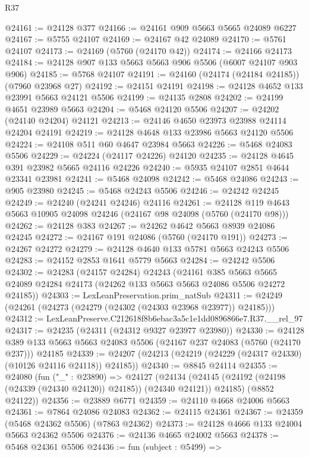 \begin{lexlean}{R37}
\begin{coremodule}
@24161 := @24128 @377
@24166 := @24161 @909 @5663 @5665 @24089 @6227
@24167 := @5755 @24107
@24169 := @24167 @42 @24089
@24170 := @5761 @24107
@24173 := @24169 (@5760 (@24170 @42))
@24174 := @24166 @24173
@24184 := @24128 @907 @133 @5663 @5663 @906 @5506 (@6007 @24107 @903 @906)
@24185 := @5768 @24107
@24191 := @24160 (@24174 (@24184 @24185)) (@7960 @23968 @27)
@24192 := @24151 @24191
@24198 := @24128 @4652 @133 @23991 @5663 @24121 @5506
@24199 := @24135 @2808
@24202 := @24199 @4651 @23989 @5663
@24204 := @5468 @24120 @5506
@24207 := @24202 (@24140 @24204) @24121
@24213 := @24146 @4650 @23973 @23988 @24114 @24204 @24191
@24219 := @24128 @4648 @133 @23986 @5663 @24120 @5506
@24224 := @24108 @511 @60 @4647 @23984 @5663
@24226 := @5468 @24083 @5506
@24229 := @24224 (@24117 @24226) @24120
@24235 := @24128 @4645 @391 @23982 @5665 @24116 @24226
@24240 := @5935 @24107 @2851 @4644 @23341 @23981
@24241 := @5468 @24098
@24242 := @5468 @24086
@24243 := @905 @23980
@24245 := @5468 @24243 @5506
@24246 := @24242 @24245
@24249 := @24240 (@24241 @24246) @24116
@24261 := @24128 @119 @4643 @5663 @10905 @24098 @24246 (@24167 @98 @24098 (@5760 (@24170 @98)))
@24262 := @24128 @383
@24267 := @24262 @4642 @5663 @8939 @24086 @24245
@24272 := @24167 @191 @24086 (@5760 (@24170 @191))
@24273 := @24267 @24272
@24279 := @24128 @4640 @133 @5781 @5663 @24243 @5506
@24283 := @24152 @2853 @1641 @5779 @5663
@24284 := @24242 @5506
@24302 := @24283
    (@24157 @24284)
    @24243
    (@24161
      @385
      @5663
      @5665
      @24089
      @24284
      @24173
      (@24262 @133 @5663 @5663 @24086 @5506 @24272 @24185))
@24303 := LexLeanPreservation.prim_natSub
@24311 := @24249 (@24261 (@24273 (@24279 (@24302 (@24303 @23968 @23977)) @24185)))
@24312 := LexLeanPreserve.C212618f8b6ebac3a5c1e1dd0896866e7.R37.__rel_97
@24317 := @24235 (@24311 (@24312 @9327 @23977 @23980))
@24330 := @24128
    @389
    @133
    @5663
    @5663
    @24083
    @5506
    (@24167 @237 @24083 (@5760 (@24170 @237)))
    @24185
@24339 := @24207 (@24213 (@24219 (@24229 (@24317 @24330) (@10126 @24116 @24118)) @24185))
@24340 := @8845 @24114
@24355 := @24080
    (fun ("_" : @23890) =>
    @24127
      (@24134 (@24145 (@24192 (@24198 (@24339 (@24340 @24120)) @24185)) (@24340 @24121)) @24185)
      (@8852 @24122))
@24356 := @23889 @6771
@24359 := @24110 @4668 @24006 @5663
@24361 := @7864 @24086 @24083
@24362 := @24115 @24361
@24367 := @24359 (@5468 @24362 @5506) (@7863 @24362)
@24373 := @24128 @4666 @133 @24004 @5663 @24362 @5506
@24376 := @24136 @4665 @24002 @5663
@24378 := @5468 @24361 @5506
@24436 := fun (subject : @5499) =>

\end{coremodule}
\end{lexlean}
